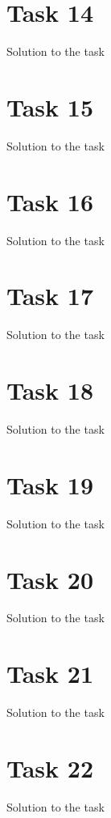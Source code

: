 \documentclass[a4paper,12pt,oneside,onecolumn]{article} %
\begin{document}
\section*{Task 14}

Solution to the task

\section*{Task 15}

Solution to the task

\section*{Task 16}

Solution to the task

\section*{Task 17}

Solution to the task

\section*{Task 18}

Solution to the task

\section*{Task 19}

Solution to the task

\section*{Task 20}

Solution to the task

\section*{Task 21}

Solution to the task

\section*{Task 22}

Solution to the task



\end{document}
